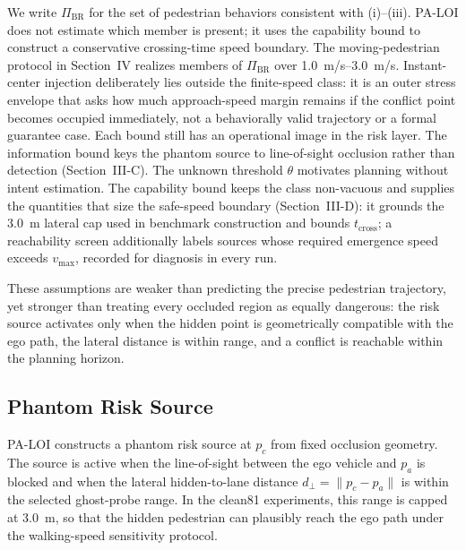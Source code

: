 \documentclass[journal]{IEEEtran}
\begin{document}
We write $\Pi_{\mathrm{BR}}$ for the set of pedestrian behaviors consistent with (i)--(iii). PA-LOI does not estimate which member is present; it uses the capability bound to construct a conservative crossing-time speed boundary. The moving-pedestrian protocol in Section~IV realizes members of $\Pi_{\mathrm{BR}}$ over \SIrange{1.0}{3.0}{m/s}. Instant-center injection deliberately lies outside the finite-speed class: it is an outer stress envelope that asks how much approach-speed margin remains if the conflict point becomes occupied immediately, not a behaviorally valid trajectory or a formal guarantee case. Each bound still has an operational image in the risk layer. The information bound keys the phantom source to line-of-sight occlusion rather than detection (Section~III-C). The unknown threshold $\theta$ motivates planning without intent estimation. The capability bound keeps the class non-vacuous and supplies the quantities that size the safe-speed boundary (Section~III-D): it grounds the \SI{3.0}{m} lateral cap used in benchmark construction and bounds $t_{\mathrm{cross}}$; a reachability screen additionally labels sources whose required emergence speed exceeds $v_{\max}$, recorded for diagnosis in every run.

These assumptions are weaker than predicting the precise pedestrian trajectory, yet stronger than treating every occluded region as equally dangerous: the risk source activates only when the hidden point is geometrically compatible with the ego path, the lateral distance is within range, and a conflict is reachable within the planning horizon.

\subsection{Phantom Risk Source}

PA-LOI constructs a phantom risk source at $p_c$ from fixed occlusion geometry. The source is active when the line-of-sight between the ego vehicle and $p_a$ is blocked and when the lateral hidden-to-lane distance $d_\perp = \|p_c - p_a\|$ is within the selected ghost-probe range. In the clean81 experiments, this range is capped at \SI{3.0}{m}, so that the hidden pedestrian can plausibly reach the ego path under the walking-speed sensitivity protocol.
\end{document}
